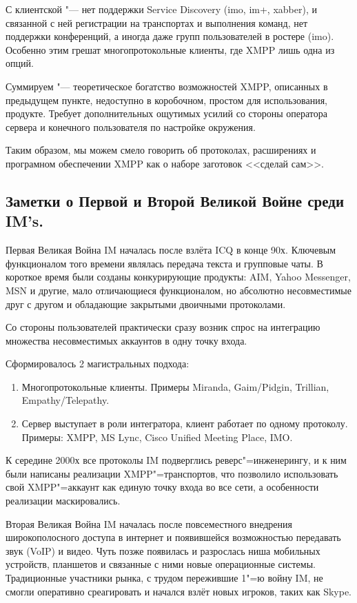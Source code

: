 \documentclass[10pt, a5paper]{article}
\begin{document}
С клиентской "--- нет поддержки Service Discovery (imo, im+, xabber), и связанной с ней регистрации на транспортах и выполнения команд, нет поддержки конференций, а иногда даже групп пользователей в ростере (imo). Особенно этим грешат многопротокольные клиенты, где XMPP лишь одна из опций.

Суммируем "--- теоретическое богатство возможностей XMPP, описанных в предыдущем пункте, недоступно в коробочном, простом для использования, продукте. Требует дополнительных ощутимых усилий со стороны оператора сервера и конечного пользователя по настройке окружения.

Таким образом, мы можем смело говорить об протоколах, расширениях  и програмном обеспечении XMPP как о наборе заготовок <<сделай сам>>.

\subsection{Заметки о Первой и Второй Великой Войне среди IM's.}

Первая Великая Война IM началась после взлёта ICQ в конце 90х. Ключевым функционалом того времени являлась передача текста и групповые чаты.  В короткое время были созданы конкурирующие продукты: AIM, Yahoo Messenger, MSN и другие, мало отличающиеся функционалом, но абсолютно несовместимые друг с другом и обладающие закрытыми двоичными протоколами.

Со стороны пользователей практически сразу возник спрос на интеграцию множества несовместимых аккаунтов в одну точку входа.

Сформировалось 2 магистральных подхода:

\begin{enumerate}
  \item Многопротокольные клиенты. Примеры Miranda, Gaim/Pidgin, Trillian, Empathy/Telepathy.
  \item Сервер выступает в роли интегратора, клиент работает по одному протоколу. Примеры: XMPP, MS Lync, Cisco Unified Meeting Place, IMO.
\end{enumerate}

К середине 2000х все  протоколы IM подверглись реверс"=инженерингу, и к ним были написаны реализации XMPP"=транспортов, что позволило использовать свой XMPP"=аккаунт как единую точку входа во все сети, а особенности реализации маскировались.

Вторая Великая Война IM началась после повсеместного внедрения широкополосного доступа в интернет и появившейся возможностью передавать звук (VoIP) и видео. Чуть позже появилась и разрослась ниша мобильных устройств, планшетов и связанные с ними новые операционные системы. Традиционные участники рынка,  с трудом пережившие 1"=ю войну IM, не смогли оперативно среагировать и начался взлёт новых игроков, таких как Skype.
\end{document}
